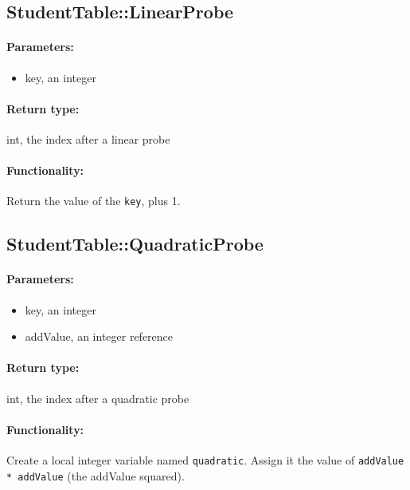 \documentclass[a4paper,12pt,oneside]{book}
\begin{document}
\hrulefill

\subsection{StudentTable::LinearProbe}

\paragraph{Parameters:}

\begin{itemize}
    \item   key, an integer
\end{itemize}

\paragraph{Return type:} int, the index after a linear probe

\paragraph{Functionality:}
Return the value of the \texttt{key}, plus 1.

\hrulefill

\subsection{StudentTable::QuadraticProbe}

\paragraph{Parameters:}

\begin{itemize}
    \item   key, an integer
    \item   addValue, an integer reference
\end{itemize}

\paragraph{Return type:} int, the index after a quadratic probe

\paragraph{Functionality:}
Create a local integer variable named \texttt{quadratic}. Assign it
the value of \texttt{addValue * addValue} (the addValue squared).
\end{document}
